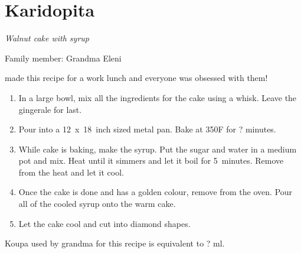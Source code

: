 \chapter{Karidopita}
\label{ch:karidopita}


\textit{Walnut cake with syrup}

Family member: Grandma Eleni

 made this recipe for a work lunch and everyone was obsessed with them!

\begin{enumerate}
    \item In a large bowl, mix all the ingredients for the cake using a whisk. Leave the gingerale for last.
    \item Pour into a 12~x~18~inch sized metal pan. Bake at 350\degree F for ? minutes.
    \item While cake is baking, make the syrup. Put the sugar and water in a medium pot and mix. Heat until it simmers and let it boil for 5~minutes. Remove from the heat and let it cool.
    \item Once the cake is done and has a golden colour, remove from the oven. Pour all of the cooled syrup onto the warm cake.
    \item Let the cake cool and cut into diamond shapes.
\end{enumerate}

Koupa used by grandma for this recipe is equivalent to ? ml.

